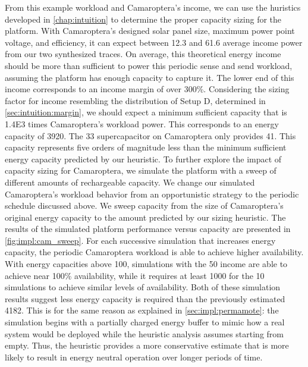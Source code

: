 From this example workload and Camaroptera's income, we can use the huristics developed in \cref{chap:intuition} to determine the proper capacity sizing for the platform.
With Camaroptera's designed solar panel size, maximum power point voltage, and efficiency, 
it can expect between 12.3 and 61.6\ssi{\milli\watt} average income power from our two synthesized traces.
On average, this theoretical energy income should be more than sufficient to power this periodic sense and send workload, assuming the platform has enough capacity to capture it.
The lower end of this income corresponds to an income margin of over 300\%. 
Considering the sizing factor for income resembling the distribution of Setup D, determined in \cref{sec:intuition:margin}, we should expect a minimum sufficient capacity that is \num{1.4E3} times Camaroptera's workload power. 
This corresponds to an energy capacity of 3920\ssi{\milli\Wh}. 
The 33\ssi{\milli\farad} supercapacitor on Camaroptera only provides 41\ssi{\micro\Wh}. This capacity represents five orders of magnitude less than the minimum sufficient energy capacity predicted by our heuristic.
To further explore the impact of capacity sizing for Camaroptera, we simulate the platform with a sweep of different amounts of rechargeable capacity. 
We change our simulated Camaroptera's workload behavior from an opportunistic strategy to the periodic schedule discussed above.
We sweep capacity from the size of Camaroptera's original energy capacity to the amount predicted by our sizing heuristic.
The results of the simulated platform performance versus capacity are presented in \cref{fig:impl:cam_sweep}.
For each successive simulation that increases energy capacity, the periodic Camaroptera workload is able to achieve higher availability.
With energy capacities above 100\ssi{\milli\watt\hour}, simulations with the 50\ssi[per-mode=symbol]{\milli\watt\per\centi\meter\squared} income are able to achieve near 100\% availability, while it requires at least 1000\ssi{\milli\watt\hour} for the 10\ssi[per-mode=symbol]{\milli\watt\per\centi\meter\squared} simulations to achieve similar levels of availability. 
Both of these simulation results suggest less energy capacity is required than the previously estimated 4182\ssi{\milli\Wh}.
This is for the same reason as explained in \cref{sec:impl:permamote}: the simulation begins with a partially charged energy buffer to mimic how a real system would be deployed while the heuristic analysis assumes starting from empty.
Thus, the heuristic provides a more conservative estimate that is more likely to result in energy neutral operation over longer periods of time.

